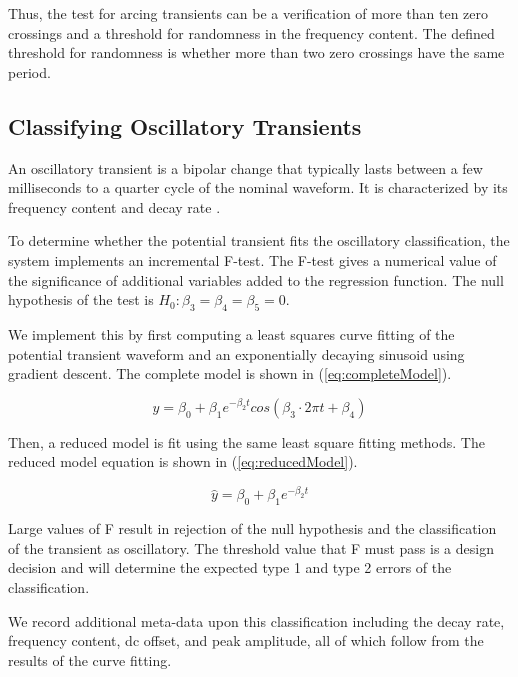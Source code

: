 \documentclass[10pt, conference, compsocconf]{IEEEtran}
\begin{document}
Thus, the test for arcing transients can  be a verification of more than ten zero crossings and a threshold for randomness in the frequency content. The defined threshold for randomness is whether more than two zero crossings have the same period.

\subsection{Classifying Oscillatory Transients}

An oscillatory transient is a bipolar change that typically lasts between a few milliseconds to a quarter cycle of the nominal waveform. It is characterized by its frequency content and decay rate \cite{IEEE:2018:1159D3}.

To determine whether the potential transient fits the oscillatory classification, the system implements an incremental F-test. The F-test gives a numerical value of the significance of additional variables added to the regression function. The null hypothesis of the test is  $H_0: \beta_3 = \beta_4 = \beta_5 = 0$.

We implement this by first computing a least squares curve fitting of the potential transient waveform and an exponentially decaying sinusoid using gradient descent. The complete model is shown in (\ref{eq:completeModel}).

\begin{equation}
\label{eq:completeModel}
\hat{y} = \beta_0 + \beta_1 e^{-\beta_2 t} cos(\beta_3 \cdot 2 \pi t + \beta_4)
\end{equation}

Then, a reduced model is fit using the same least square fitting methods. The reduced model equation is shown in (\ref{eq:reducedModel}).

\begin{equation}
\label{eq:reducedModel}
\hat{y} = \beta_0 + \beta_1 e^{-\beta_2 t}
\end{equation}

Large values of F result in rejection of the null hypothesis and the classification of the transient as oscillatory. The threshold value that F must pass is a design decision and will determine the expected type 1 and type 2 errors of the classification.

We record additional meta-data upon this classification including the decay rate, frequency content, dc offset, and peak amplitude, all of which follow from the results of the curve fitting.
\end{document}
